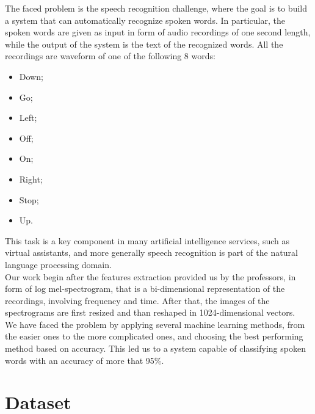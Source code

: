 \documentclass[10pt,twocolumn,letterpaper]{article}
\begin{document}
The faced problem is the speech recognition challenge, where the goal is to build a system that can automatically recognize spoken words. In particular, the spoken words are given as input in form of audio recordings of one second length, while the output of the system is the text of the recognized words. All the recordings are waveform of one of the following 8 words:
\begin{itemize}
	\itemsep-0.3em 
	\item Down;
	\item Go;
	\item Left;
	\item Off;
	\item On;
	\item Right;
	\item Stop;
	\item Up.
\end{itemize}
This task is a key component in many artificial intelligence services, such as virtual assistants, and more generally speech recognition is part of the natural language processing domain.\\
Our work begin after the features extraction provided us by the professors, in form of log mel-spectrogram, that is a bi-dimensional representation of the recordings, involving frequency and time. After that, the images of the spectrograms are first resized and than reshaped in 1024-dimensional vectors.\\
We have faced the problem by applying several machine learning methods, from the easier ones to the more complicated ones, and choosing the best performing method based on accuracy. This led us to a system capable of classifying spoken words with an accuracy of more that 95\%. 

\section{Dataset}
\end{document}
